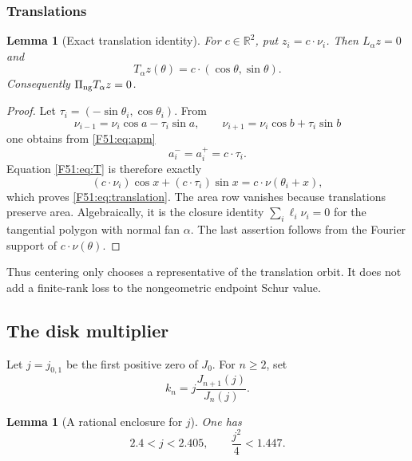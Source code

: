 \documentclass[11pt]{amsart}
\numberwithin{equation}{section}
\newtheorem{lemma}[theorem]{Lemma}
\theoremstyle{definition}
\theoremstyle{remark}
\newcommand{\R}{\mathbb R}
\newcommand{\PiNG}{\Pi_{\rm ng}}
\begin{document}
\subsubsection{Translations}

\begin{lemma}[Exact translation identity]\label{F51:lem:translations}
For $c\in\R^2$, put $z_i=c\cdot\nu_i$.  Then $L_\alpha z=0$ and
\begin{equation}\label{F51:eq:translation}
 T_\alpha z(\theta)=c\cdot(\cos\theta,\sin\theta).
\end{equation}
Consequently $\PiNG T_\alpha z=0$.
\end{lemma}

\begin{proof}
Let $\tau_i=(-\sin\theta_i,\cos\theta_i)$.  From
\begin{equation}
 \nu_{i-1}=\nu_i\cos a-\tau_i\sin a,
 \qquad
 \nu_{i+1}=\nu_i\cos b+\tau_i\sin b
\end{equation}
one obtains from \eqref{F51:eq:apm}
\begin{equation}
 a_i^-=a_i^+=c\cdot\tau_i.
\end{equation}
Equation \eqref{F51:eq:T} is therefore exactly
\begin{equation}
 (c\cdot\nu_i)\cos x+(c\cdot\tau_i)\sin x
 =c\cdot\nu(\theta_i+x),
\end{equation}
which proves \eqref{F51:eq:translation}.  The area row vanishes because
translations preserve area.  Algebraically, it is the closure identity
$\sum_i\ell_i\nu_i=0$ for the tangential polygon with normal fan $\alpha$.
The last assertion follows from the Fourier support of
$c\cdot\nu(\theta)$.
\end{proof}

Thus centering only chooses a representative of the translation orbit.  It
does not add a finite-rank loss to the nongeometric endpoint Schur value.

\subsection{The disk multiplier}

Let $j=j_{0,1}$ be the first positive zero of $J_0$.  For $n\ge2$, set
\begin{equation}\label{F51:eq:kn}
 k_n=j\frac{J_{n+1}(j)}{J_n(j)}.
\end{equation}

\begin{lemma}[A rational enclosure for $j$]\label{F51:lem:j-bound}
One has
\begin{equation}\label{F51:eq:j-bound}
 2.4<j<2.405,
 \qquad \frac{j^2}{4}<1.447.
\end{equation}
\end{lemma}
\end{document}

